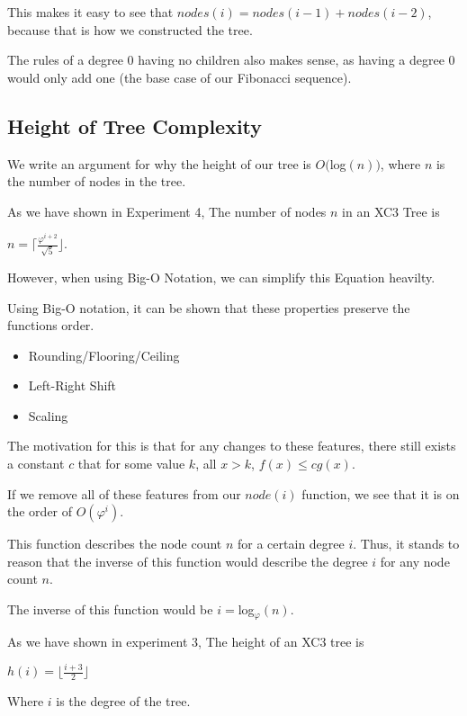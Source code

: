 \documentclass{article}
\begin{document}
This makes it easy to see that $nodes(i) = nodes(i-1) + nodes(i-2)$, because that is how we constructed the tree.

The rules of a degree 0 having no children also makes sense, as having a degree 0 would only add one (the base case of our Fibonacci sequence).

\subsection{Height of Tree Complexity}

We write an argument for why the height of our tree is $O($log$(n))$, where $n$ is the number of nodes in the tree.

As we have shown in Experiment 4, The number of nodes $n$ in an XC3 Tree is
{
\begin{center}
    $n = \lceil \frac{\varphi^{i+2}}{\sqrt{5}} \rfloor$.\\
    $ $
\end{center}
}

However, when using Big-O Notation, we can simplify this Equation heavilty.

Using Big-O notation, it can be shown that these properties preserve the functions order.
\begin{itemize}
    \item Rounding/Flooring/Ceiling
    \item Left-Right Shift
    \item Scaling
\end{itemize}

The motivation for this is that for any changes to these features, there still exists a constant $c$ that for some value $k$, all $x > k$, $f(x) \leq cg(x)$.

If we remove all of these features from our $node(i)$ function, we see that it is on the order of $O(\varphi^i)$.

This function describes  the node count $n$ for a certain degree $i$. Thus, it stands to reason that the inverse of this function would describe the degree $i$ for any node count $n$.

The inverse of this function would be $i = $log$_{\varphi}(n)$.

As we have shown in experiment 3, The height of an XC3 tree is
{
\begin{center}
    $h(i) = \lfloor \frac{i+3}{2} \rfloor$\\
    $ $
\end{center}
}
Where $i$ is the degree of the tree.
\end{document}
